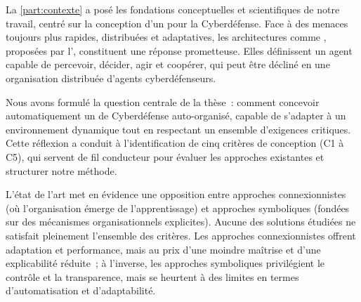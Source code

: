 La \autoref{part:contexte} a posé les fondations conceptuelles et scientifiques de notre travail, centré sur la conception d’un  pour la Cyberdéfense. Face à des menaces toujours plus rapides, distribuées et adaptatives, les architectures comme , proposées par l’, constituent une réponse prometteuse. Elles définissent un agent capable de percevoir, décider, agir et coopérer, qui peut être décliné en une organisation distribuée d’agents cyberdéfenseurs.

Nous avons formulé la question centrale de la thèse~: comment concevoir automatiquement un  de Cyberdéfense auto-organisé, capable de s’adapter à un environnement dynamique tout en respectant un ensemble d’exigences critiques. Cette réflexion a conduit à l’identification de cinq critères de conception (C1 à C5), qui servent de fil conducteur pour évaluer les approches existantes et structurer notre méthode.

L’état de l’art met en évidence une opposition entre approches connexionnistes (où l’organisation émerge de l’apprentissage) et approches symboliques (fondées sur des mécanismes organisationnels explicites). Aucune des solutions étudiées ne satisfait pleinement l’ensemble des critères. Les approches connexionnistes offrent adaptation et performance, mais au prix d’une moindre maîtrise et d’une explicabilité réduite~; à l’inverse, les approches symboliques privilégient le contrôle et la transparence, mais se heurtent à des limites en termes d’automatisation et d’adaptabilité.

